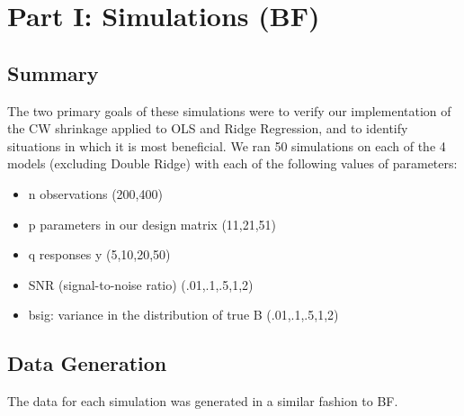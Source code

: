 \documentclass{article}
\begin{document}
\section{Part I: Simulations (BF)}\label{part-i-simulations-bf}

\subsection{Summary}

The two primary goals of these simulations were to verify our
implementation of the CW shrinkage applied to OLS and Ridge Regression,
and to identify situations in which it is most beneficial. We ran 50
simulations on each of the 4 models (excluding Double Ridge) with each
of the following values of parameters:

\begin{itemize}
\itemsep1pt\parskip0pt
\item
  n observations (200,400)
\item
  p parameters in our design matrix (11,21,51)
\item
  q responses y (5,10,20,50)
\item
  SNR (signal-to-noise ratio) (.01,.1,.5,1,2)
\item
  bsig: variance in the distribution of true B (.01,.1,.5,1,2)
\end{itemize}

\subsection{Data Generation}\label{data-generation}

The data for each simulation was generated in a similar fashion to BF.
\end{document}
